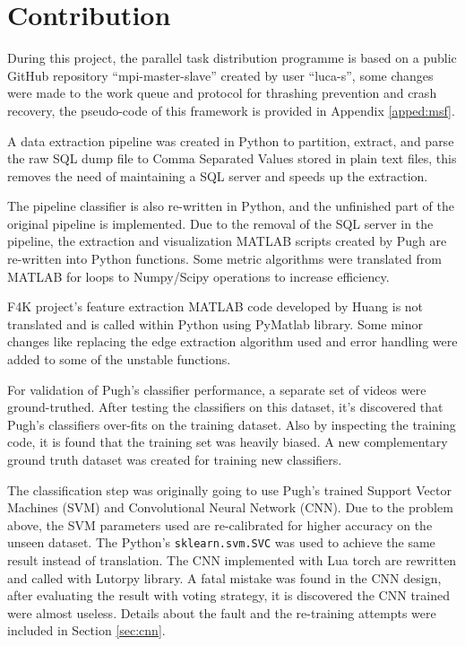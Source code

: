 \documentclass[bsc,frontabs,twoside,fullspacing,parskip,deptreport]{infthesis}
\begin{document}
\section{Contribution}

During this project, the parallel task distribution programme is based on a public GitHub repository ``mpi-master-slave'' created by user ``luca-s''\cite{L5}, some changes were made to the work queue and protocol for thrashing prevention and crash recovery, the pseudo-code of this framework is provided in Appendix \ref{apped:msf}.

A data extraction pipeline was created in Python to partition, extract, and parse the raw SQL dump file to Comma Separated Values stored in plain text files, this removes the need of maintaining a SQL server and speeds up the extraction. 

The pipeline classifier is also re-written in Python, and the unfinished part of the original pipeline is implemented. 
Due to the removal of the SQL server in the pipeline, the extraction and visualization MATLAB scripts created by Pugh are re-written into Python functions. 
Some metric algorithms were translated from MATLAB for loops to Numpy/Scipy operations to increase efficiency.

F4K project's feature extraction MATLAB code developed by Huang\cite{Huang} is not translated and is called within Python using PyMatlab library. Some minor changes like replacing the edge extraction algorithm used and error handling were added to some of the unstable functions. 

For validation of Pugh's classifier performance, a separate set of videos were ground-truthed. After testing the classifiers on this dataset, it's discovered that Pugh's classifiers over-fits on the training dataset. Also by inspecting the training code, it is found that the training set was heavily biased. A new complementary ground truth dataset was created for training new classifiers. 

The classification step was originally going to use Pugh's trained Support Vector Machines (SVM) and Convolutional Neural Network (CNN). Due to the problem above, the SVM parameters used are re-calibrated for higher accuracy on the unseen dataset. 
The Python's {\tt sklearn.svm.SVC} was used to achieve the same result instead of translation. The CNN implemented with Lua torch are rewritten and called with Lutorpy library.
A fatal mistake was found in the CNN design, after evaluating the result with voting strategy, it is discovered the CNN trained were almost useless. Details about the fault and the re-training attempts were included in Section \ref{sec:cnn}.
\end{document}
